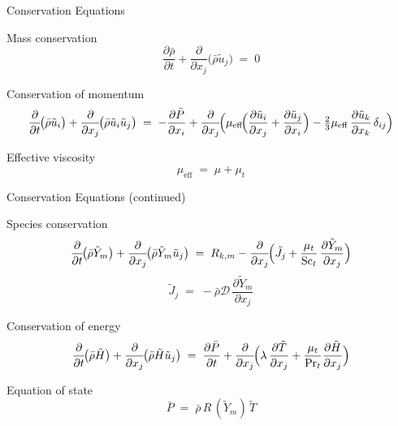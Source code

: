 \documentclass[10pt,aspectratio=43]{beamer}
\newcommand{\pd}[2]{\frac{\partial #1}{\partial #2}}
\begin{document}
\begin{frame}{Conservation Equations}
  \begin{block}{Mass conservation}
    \[
      \pd{\bar{\rho}}{t} + \pd{}{x_{j}}\!\bigl(\bar{\rho}\tilde{u}_{j}\bigr) \;=\; 0
    \]
  \end{block}
  \begin{block}{Conservation of momentum}
    \[
      \pd{}{t}\!\bigl(\bar{\rho}\tilde{u}_{i}\bigr) + \pd{}{x_{j}}\!\bigl(\bar{\rho}\tilde{u}_{i}\tilde{u}_{j}\bigr)
        \;=\; -\pd{\bar{P}}{x_{i}}
              + \pd{}{x_{j}}\!\Bigl(\mu_{\mathrm{eff}}\!\Bigl(\pd{\tilde{u}_{i}}{x_{j}}+\pd{\tilde{u}_{j}}{x_{i}}\Bigr)
                            - \tfrac{2}{3}\mu_{\mathrm{eff}}\,\pd{\tilde{u}_{k}}{x_{k}}\,\delta_{ij}\Bigr)
    \]
  \end{block}
  \begin{block}{Effective viscosity}
    \[
      \mu_{\mathrm{eff}} \;=\; \mu + \mu_{t}
    \]
  \end{block}
\end{frame}

\begin{frame}{Conservation Equations (continued)}
  \begin{block}{Species conservation}
    \[
      \pd{}{t}\!\bigl(\bar{\rho}\tilde{Y}_{m}\bigr) + \pd{}{x_{j}}\!\bigl(\bar{\rho}\tilde{Y}_{m}\tilde{u}_{j}\bigr)
        \;=\; R_{k,m} - \pd{}{x_{j}}\!\Bigl(\tilde{J}_{j} + \frac{\mu_{t}}{\mathrm{Sc}_{t}}\,\pd{\tilde{Y}_{m}}{x_{j}}\Bigr)
    \]
    \[
      \tilde{J}_{j} \;=\; -\bar{\rho}\mathcal{D}\,\pd{\tilde{Y}_{m}}{x_{j}}
    \]
  \end{block}
  \begin{block}{Conservation of energy}
    \[
      \pd{}{t}\!\bigl(\bar{\rho}\tilde{H}\bigr) + \pd{}{x_{j}}\!\bigl(\bar{\rho}\tilde{H}\tilde{u}_{j}\bigr)
        \;=\; \pd{\bar{P}}{t} + \pd{}{x_{j}}\!\Bigl(\lambda\,\pd{\tilde{T}}{x_{j}}+\frac{\mu_{t}}{\mathrm{Pr}_{t}}\pd{\tilde{H}}{x_{j}}\Bigr)
    \]
  \end{block}
  \begin{block}{Equation of state}
    \[
      \bar{P} \;=\; \bar{\rho}\,R\,(\tilde{Y}_{m})\,\tilde{T}
    \]
  \end{block}
\end{frame}
\end{document}

